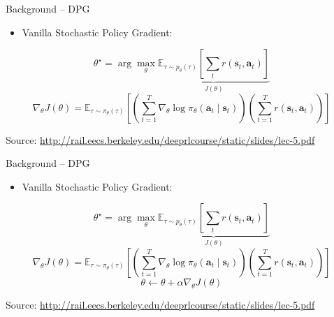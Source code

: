 \begin{frame}{Background -- DPG}
\begin{itemize}
    \item Vanilla Stochastic Policy Gradient:
\end{itemize}
\[
\theta^{\star} = \arg\max_{\theta} \underbrace{\mathbb{E}_{\tau \sim p_\theta(\tau)}\!\left[ \sum_t r(\mathbf{s}_t, \mathbf{a}_t) \right]}_{J(\theta)}
\]
\[
\nabla_\theta J(\theta) = \mathbb{E}_{\tau \sim \pi_\theta(\tau)}\!\left[ \left( \sum_{t=1}^{T} \nabla_\theta \log \pi_\theta(\mathbf{a}_t \mid \mathbf{s}_t) \right) \left( \sum_{t=1}^{T} r(\mathbf{s}_t, \mathbf{a}_t) \right) \right]
\]
\vfill
\begin{flushright}
    \tiny Source: \url{http://rail.eecs.berkeley.edu/deeprlcourse/static/slides/lec-5.pdf}
\end{flushright}
\end{frame}

\begin{frame}{Background -- DPG}
\begin{itemize}
    \item Vanilla Stochastic Policy Gradient:
\end{itemize}
\[
\theta^{\star} = \arg\max_{\theta} \underbrace{\mathbb{E}_{\tau \sim p_\theta(\tau)}\!\left[ \sum_t r(\mathbf{s}_t, \mathbf{a}_t) \right]}_{J(\theta)}
\]
\[
\nabla_\theta J(\theta) = \mathbb{E}_{\tau \sim \pi_\theta(\tau)}\!\left[ \left( \sum_{t=1}^{T} \nabla_\theta \log \pi_\theta(\mathbf{a}_t \mid \mathbf{s}_t) \right) \left( \sum_{t=1}^{T} r(\mathbf{s}_t, \mathbf{a}_t) \right) \right]
\]
\[
\theta \leftarrow \theta + \alpha \nabla_\theta J(\theta)
\]
\vfill
\begin{flushright}
    \tiny Source: \url{http://rail.eecs.berkeley.edu/deeprlcourse/static/slides/lec-5.pdf}
\end{flushright}
\end{frame}

